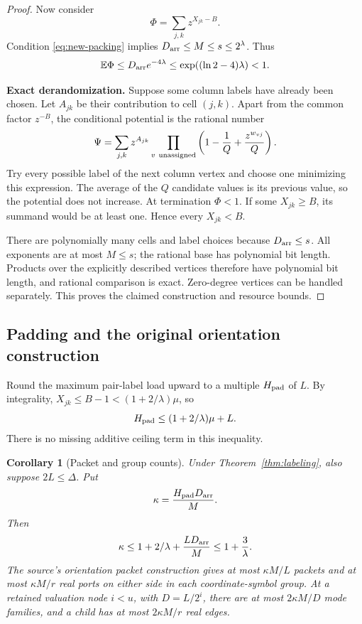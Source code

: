 \documentclass[11pt,letterpaper]{article}
\numberwithin{equation}{section}
\newtheorem{corollary}[theorem]{Corollary}
\theoremstyle{definition}\newtheorem{definition}[theorem]{Definition}
\theoremstyle{remark}\newtheorem{remark}[theorem]{Remark}
\newcommand{\Darr}{D_{\rm arr}}
\newcommand{\Hpad}{H_{\rm pad}}
\begin{document}
\begin{proof}
Now consider
\[
 \Phi=\sum_{j,k}z^{X_{jk}-B}.
\]
Condition \eqref{eq:new-packing} implies $\Darr\le M\le s\le2^\lambda$.
Thus
\[
 \mathbb E\Phi\le\Darr e^{-4\lambda}
 \le\exp((\ln2-4)\lambda)<1.
\]

\textbf{Exact derandomization.}
Suppose some column labels have already been chosen. Let $A_{jk}$ be
their contribution to cell $(j,k)$. Apart from the common factor $z^{-B}$,
the conditional potential is the rational number
\begin{equation}
 \Psi=
 \sum_{j,k}z^{A_{jk}}
 \prod_{v\ {\rm unassigned}}
       \left(1-\frac1Q+\frac{z^{w_{vj}}}{Q}\right).
 \label{eq:conditional}
\end{equation}
Try every possible label of the next column vertex and choose one minimizing
this expression. The average of the $Q$ candidate values is its previous
value, so the potential does not increase. At termination $\Phi<1$.
If some $X_{jk}\ge B$, its summand would be at least one. Hence every
$X_{jk}<B$.

There are polynomially many cells and label choices because
$\Darr\le s$. All exponents are at most $M\le s$; the rational base has
polynomial bit length. Products over the explicitly described vertices
therefore have polynomial bit length, and rational comparison is exact.
Zero-degree vertices can be handled separately. This proves the claimed
construction and resource bounds.
\end{proof}

\subsection{Padding and the original orientation construction}

Round the maximum pair-label load upward to a multiple $\Hpad$ of $L$.
By integrality, $X_{jk}\le B-1<(1+2/\lambda)\mu$, so
\[
 \Hpad\le (1+2/\lambda)\mu+L.
\]
There is no missing additive ceiling term in this inequality.

\begin{corollary}[Packet and group counts]\label{cor:packets}
Under Theorem~\ref{thm:labeling}, also suppose $2L\le\Delta$. Put
\[
 \kappa=\frac{\Hpad\Darr}{M}.
\]
Then
\begin{equation}
 \kappa\le1+2/\lambda+\frac{L\Darr}{M}
 \le1+\frac3\lambda.\label{eq:kappa}
\end{equation}
The source's orientation packet construction gives at most
$\kappa M/L$ packets and at most $\kappa M/r$ real ports on either side
in each coordinate-symbol group. At a retained valuation node
$i<u$, with $D=L/2^i$, there are at most $2\kappa M/D$ mode families,
and a child has at most $2\kappa M/r$ real edges.
\end{corollary}
\end{document}
